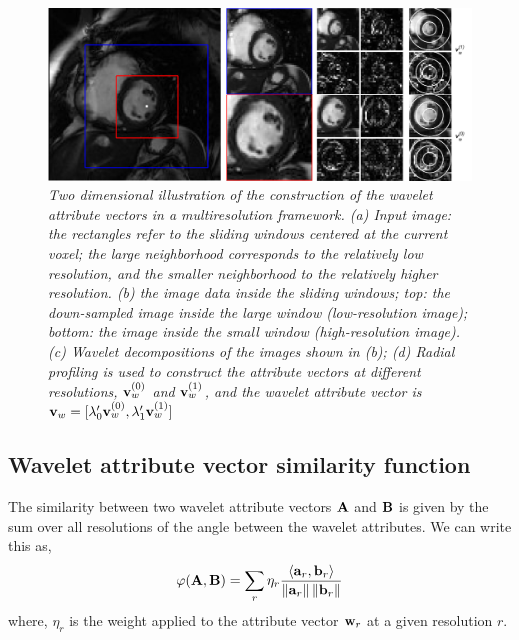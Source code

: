  
\begin{figure}
     \begin{center}
	   \includegraphics[width=1\textwidth]{images/wav/wav_const}
	   
	   \end{center}  
     \caption{
\em \small Two dimensional illustration of the construction of the wavelet attribute vectors in a multiresolution framework. (a) Input image: the rectangles refer to the sliding windows centered at the current voxel; the large neighborhood corresponds to the relatively low resolution, and the smaller neighborhood to the relatively higher resolution. (b) the image data inside the sliding windows; top: the down-sampled image inside the large window (low-resolution image); bottom: the image inside the small window (high-resolution image). (c) Wavelet decompositions of the images shown in (b); (d) Radial profiling is used to construct the attribute vectors at different resolutions, $\mathbf{v} _w^{(0)}$ and $\mathbf{v} _w^{(1)}$, and the wavelet attribute vector is $\mathbf{v} _w = [\lambda'_0\mathbf{v} _w^{(0)} , \lambda'_1\mathbf{v} _w^{(1)}] $
}
     \label{fig:wav_const}
\end{figure}

\subsection{Wavelet attribute vector similarity function}
\label {sec:attribSim}

The similarity between two wavelet attribute vectors $\mathbf{A}$ and $\mathbf{B}$ is given by the sum over all resolutions of the angle between the wavelet attributes. We can write this as,
\[
 \varphi(\mathbf{A}, \mathbf{B}) = \sum_{r} \eta_r \frac{\left\langle \mathbf{a}_r, \mathbf{b}_r\right\rangle}
                                                                  {\left\|\mathbf{a}_r\right\|\left\|\mathbf{b}_r\right\|}
\]
where, $\eta_r$ is the weight applied to the attribute vector $\mathbf{w}_r$ at a given resolution $r$.

